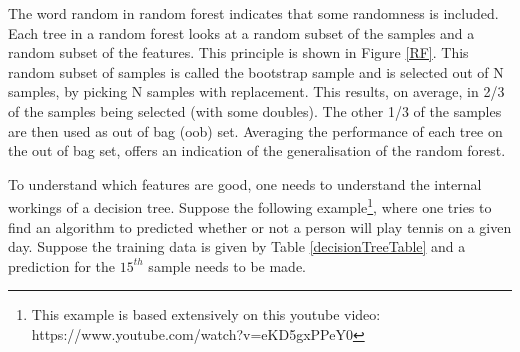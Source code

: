 \npar

The word random in random forest indicates that some randomness is included. Each tree in a random forest looks at a random subset of the samples and a random subset of the features. This principle is shown in Figure \ref{RF}. This random subset of samples is called the bootstrap sample and is selected out of N samples, by picking N samples with replacement. This results, on average, in 2/3 of the samples being selected (with some doubles). The other 1/3 of the samples are then used as out of bag (oob)  set. Averaging the performance of each tree on the out of bag set, offers an indication of the generalisation of the random forest.


To understand which features are good, one needs to understand the internal workings of a decision tree. Suppose the following example\footnote{This example is based extensively on this youtube video: https://www.youtube.com/watch?v=eKD5gxPPeY0}, where one tries to find an algorithm to predicted whether or not a person will play tennis on a given day. Suppose the training data is given by Table \ref{decisionTreeTable} and a prediction for the $15^{th}$ sample needs to be made.

